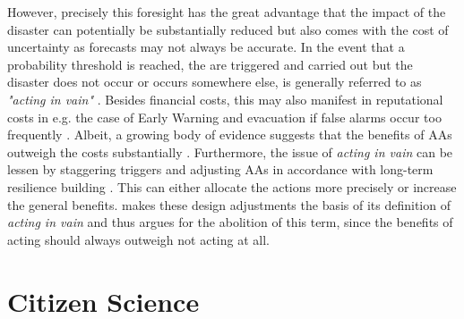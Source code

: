 However, precisely this foresight has the great advantage that the impact of the disaster can potentially be substantially reduced but also comes with the cost of uncertainty as forecasts may not always be accurate. In the event that a probability threshold is reached, the  are triggered and carried out but the disaster does not occur or occurs somewhere else, is generally referred to as \textit{"acting in vain"} \autocite{coughlandeperezForecastbasedFinancingApproach2015}. Besides financial costs, this may also manifest in reputational costs in e.g. the case of Early Warning and evacuation if false alarms occur too frequently \autocite{stephensFORECASTBASEDACTION2015}. Albeit, a growing body of evidence suggests that the benefits of AAs outweigh the costs substantially \autocite{cabotventonEconomicsResilienceDrought2018,coughlandeperezForecastbasedFinancingApproach2015,gualazziniEWEAEarlyWarning2021}. Furthermore, the issue of \textit{acting in vain} can be lessen by staggering triggers and adjusting AAs in accordance with long-term resilience building \autocite{wfpMonitoringEvaluationAnticipatory2021}. This can either allocate the actions more precisely or increase the general benefits. \Textcite{ifrcGlossaryTermsForecastbased2023} makes these design adjustments the basis of its definition of \textit{acting in vain} and thus argues for the abolition of this term, since the benefits of acting should always outweigh not acting at all.


\section{Citizen Science}\label{sec:cs}

